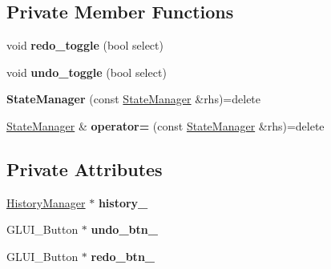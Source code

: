 \subsection*{Private Member Functions}
\begin{DoxyCompactItemize}
\item 
void {\bfseries redo\+\_\+toggle} (bool select)\hypertarget{classimage__tools_1_1StateManager_af5b298291a12460eb3ab6c7af9c16e70}{}\label{classimage__tools_1_1StateManager_af5b298291a12460eb3ab6c7af9c16e70}

\item 
void {\bfseries undo\+\_\+toggle} (bool select)\hypertarget{classimage__tools_1_1StateManager_ab617fd412a4fa0d757cd96f5bf836dd0}{}\label{classimage__tools_1_1StateManager_ab617fd412a4fa0d757cd96f5bf836dd0}

\item 
{\bfseries State\+Manager} (const \hyperlink{classimage__tools_1_1StateManager}{State\+Manager} \&rhs)=delete\hypertarget{classimage__tools_1_1StateManager_ab3202a4aaa1fbf6415597218f6182530}{}\label{classimage__tools_1_1StateManager_ab3202a4aaa1fbf6415597218f6182530}

\item 
\hyperlink{classimage__tools_1_1StateManager}{State\+Manager} \& {\bfseries operator=} (const \hyperlink{classimage__tools_1_1StateManager}{State\+Manager} \&rhs)=delete\hypertarget{classimage__tools_1_1StateManager_a84c8b7a722a9e41da3569ad1d3a05f21}{}\label{classimage__tools_1_1StateManager_a84c8b7a722a9e41da3569ad1d3a05f21}

\end{DoxyCompactItemize}
\subsection*{Private Attributes}
\begin{DoxyCompactItemize}
\item 
\hyperlink{classHistoryManager}{History\+Manager} $\ast$ {\bfseries history\+\_\+}\hypertarget{classimage__tools_1_1StateManager_aaf8e111aae4675ad01dd318428f25cc2}{}\label{classimage__tools_1_1StateManager_aaf8e111aae4675ad01dd318428f25cc2}

\item 
G\+L\+U\+I\+\_\+\+Button $\ast$ {\bfseries undo\+\_\+btn\+\_\+}\hypertarget{classimage__tools_1_1StateManager_adbe2820d914eb5ba08de3dfcc61aa82d}{}\label{classimage__tools_1_1StateManager_adbe2820d914eb5ba08de3dfcc61aa82d}

\item 
G\+L\+U\+I\+\_\+\+Button $\ast$ {\bfseries redo\+\_\+btn\+\_\+}\hypertarget{classimage__tools_1_1StateManager_a6fd0aef5e8fc7b52cf6f9de416ac4825}{}\label{classimage__tools_1_1StateManager_a6fd0aef5e8fc7b52cf6f9de416ac4825}

\end{DoxyCompactItemize}


